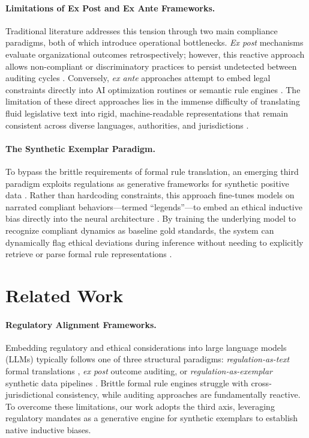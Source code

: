 \documentclass[pdflatex,sn-mathphys-num]{sn-jnl}%
\theoremstyle{thmstyleone}%
\theoremstyle{thmstyletwo}%
\theoremstyle{thmstylethree}%
\begin{document}
\paragraph{Limitations of Ex Post and Ex Ante Frameworks.} Traditional
literature addresses this tension through two main compliance paradigms, both of
which introduce operational bottlenecks. \textit{Ex post} mechanisms evaluate
organizational outcomes retrospectively; however, this reactive approach allows
non-compliant or discriminatory practices to persist undetected between auditing
cycles \citep{sargsyan2025compliance}. Conversely, \textit{ex ante} approaches
attempt to embed legal constraints directly into AI optimization routines or
semantic rule engines \citep{achintalwar2024alignment, mclaughlin2021x2rl}. The
limitation of these direct approaches lies in the immense difficulty of
translating fluid legislative text into rigid, machine-readable representations
that remain consistent across diverse languages, authorities, and jurisdictions
\citep{motzfeldt2018digital}.

\paragraph{The Synthetic Exemplar Paradigm.} To bypass the brittle requirements
of formal rule translation, an emerging third paradigm exploits regulations as
generative frameworks for synthetic positive data
\citep{sargsyan2025compliance}. Rather than hardcoding constraints, this
approach fine-tunes models on narrated compliant behaviors—termed ``legends''—to
embed an ethical inductive bias directly into the neural architecture
\citep{northcutt2017confident, kanyamukenge2024organisational}. By training the
underlying model to recognize compliant dynamics as baseline gold standards, the
system can dynamically flag ethical deviations during inference without needing
to explicitly retrieve or parse formal rule representations
\citep{mauri2022patterns}.

\section{Related Work}

\paragraph{Regulatory Alignment Frameworks.} Embedding regulatory and ethical
considerations into large language models (LLMs) typically follows one of three
structural paradigms: \textit{regulation-as-text} formal translations
\citep{mclaughlin2021x2rl, achintalwar2024alignment}, \textit{ex post} outcome
auditing, or \textit{regulation-as-exemplar} synthetic data pipelines
\citep{sargsyan2025compliance}. Brittle formal rule engines struggle with
cross-jurisdictional consistency, while auditing approaches are fundamentally
reactive. To overcome these limitations, our work adopts the third axis,
leveraging regulatory mandates as a generative engine for synthetic exemplars to
establish native inductive biases.
\end{document}
